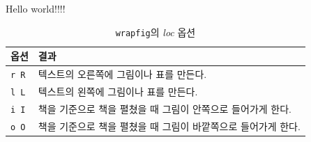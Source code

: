 \documentclass[11pt]{article}
\begin{document}
Hello world!!!!

\newpage \clearpage
\begin{table}
\caption{\texttt{wrapfig}의 \emph{loc} 옵션 \label{tab:wraptable}}
\begin{tabular}{p{2cm}|p{5cm}} \hline
옵션 & 결과 \\ \hline
\texttt{r R} & 텍스트의 오른쪽에 그림이나 표를 만든다. \\
\texttt{l L} & 텍스트의 왼쪽에 그림이나 표를 만든다. \\
\texttt{i I} & 책을 기준으로 책을 펼쳤을 때 그림이 안쪽으로 들어가게 한다. \\
\texttt{o O} & 책을 기준으로 책을 펼쳤을 때 그림이 바깥쪽으로 들어가게 한다. \\ \hline
\end{tabular}
\end{table}
\end{document}

